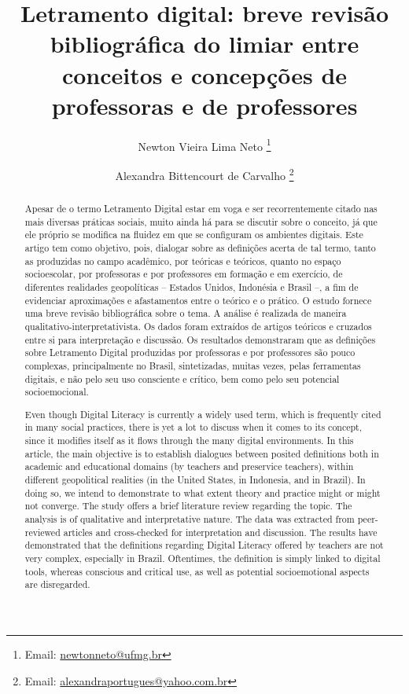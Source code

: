 \documentclass[portuguese]{textolivre}
\title{Letramento digital: breve revisão bibliográfica do limiar entre conceitos e concepções de professoras e de professores}
\author[1,2]{Newton Vieira Lima Neto  \orcid{0000-0002-2824-8337} \thanks{Email: \href{mailto:newtonneto@ufmg.br}{newtonneto@ufmg.br}}}
\author[1]{Alexandra Bittencourt de Carvalho  \orcid{0000-0003-3159-2021} \thanks{Email: \href{mailto:alexandraportugues@yahoo.com.br}{alexandraportugues@yahoo.com.br}}}
\affil[1]{Universidade Federal de Minas Gerais, Faculdade de Letras, Belo Horizonte, MG, Brasil.}
\affil[2]{Instituto Federal de Brasília, Riacho Fundo I, Brasília, DF, Brasil.}
\begin{document}
\maketitle

\begin{polyabstract}
\begin{abstract}
Apesar de o termo Letramento Digital estar em voga e ser recorrentemente citado nas mais diversas práticas sociais, muito ainda há para se discutir sobre o conceito, já que ele próprio se modifica na fluidez em que se configuram os ambientes digitais. Este artigo tem como objetivo, pois, dialogar sobre as definições acerta de tal termo, tanto as produzidas no campo acadêmico, por teóricas e teóricos, quanto no espaço socioescolar, por professoras e por professores em formação e em exercício, de diferentes realidades geopolíticas – Estados Unidos, Indonésia e Brasil –, a fim de evidenciar aproximações e afastamentos entre o teórico e o prático. O estudo fornece uma breve revisão bibliográfica sobre o tema. A análise é realizada de maneira qualitativo-interpretativista. Os dados foram extraídos de artigos teóricos e cruzados entre si para interpretação e discussão. Os resultados demonstraram que as definições sobre Letramento Digital produzidas por professoras e por professores são pouco complexas, principalmente no Brasil, sintetizadas, muitas vezes, pelas ferramentas digitais, e não pelo seu uso consciente e crítico, bem como pelo seu potencial socioemocional.

\end{abstract}

\begin{english}
\begin{abstract}
Even though Digital Literacy is currently a widely used term, which is frequently cited in many social practices, there is yet a lot to discuss when it comes to its concept, since it modifies itself as it flows through the many digital environments. In this article, the main objective is to establish dialogues between posited definitions both in academic and educational domains (by teachers and preservice teachers), within different geopolitical realities (in the United States, in Indonesia, and in Brazil). In doing so, we intend to demonstrate to what extent theory and practice might or might not converge. The study offers a brief literature review regarding the topic. The analysis is of qualitative and interpretative nature. The data was extracted from peer-reviewed articles and cross-checked for interpretation and discussion. The results have demonstrated that the definitions regarding Digital Literacy offered by teachers are not very complex, especially in Brazil. Oftentimes, the definition is simply linked to digital tools, whereas conscious and critical use, as well as potential socioemotional aspects are disregarded.

\end{abstract}
\end{english}
\end{polyabstract}
\end{document}
